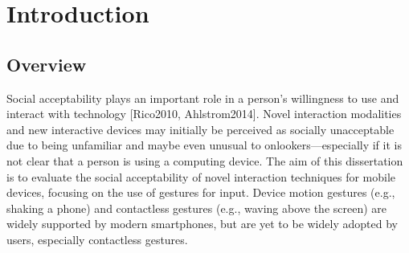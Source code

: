 \documentclass{l4proj}
\begin{document}
\tableofcontents
%
%
%
%
%
% 
%
%
\chapter{Introduction}



\section{Overview}
Social acceptability plays an important role in a person's willingness to use and interact with technology [Rico2010, Ahlstrom2014]. Novel interaction modalities and new interactive devices may initially be perceived as socially unacceptable due to being unfamiliar and maybe even unusual to onlookers---especially if it is not clear that a person is using a computing device. The aim of this dissertation is to evaluate the social acceptability of novel interaction techniques for mobile devices, focusing on the use of gestures for input. Device motion gestures (e.g., shaking a phone) and contactless gestures (e.g., waving above the screen) are widely supported by modern smartphones, but are yet to be widely adopted by users, especially contactless gestures.
\end{document}
